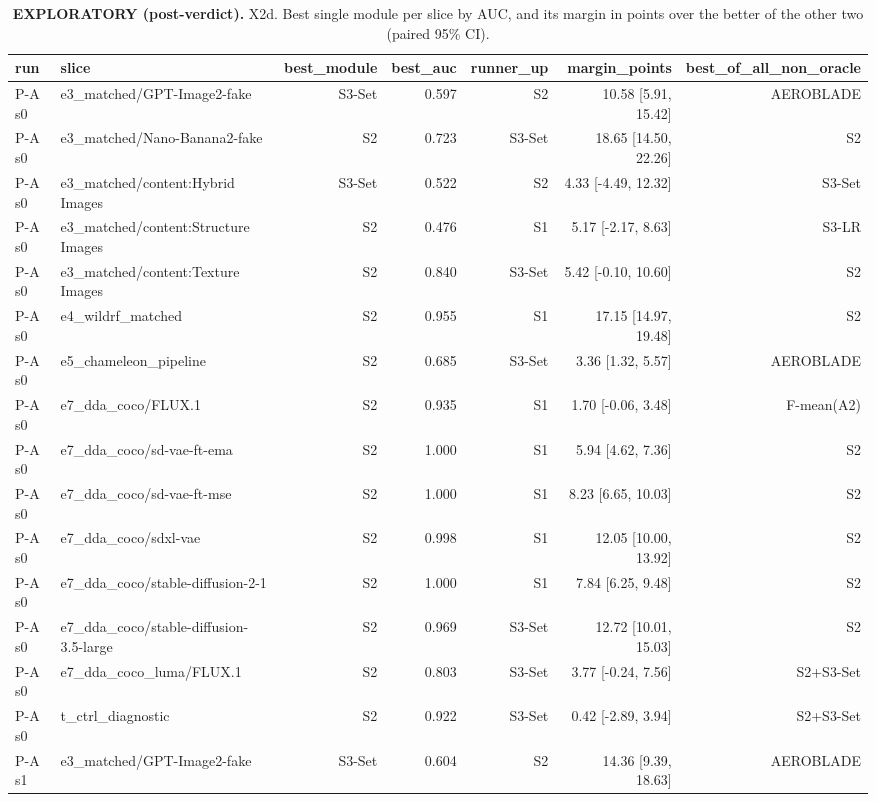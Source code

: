 \begin{table}[htbp]
\centering
\scriptsize
\caption{\textbf{EXPLORATORY (post-verdict).} X2d. Best single module per slice by AUC, and its margin in points over the better of the other two (paired 95\% CI).}
\label{tab:x2d-who-wins}
\begin{tabular}{llrrrrr}
\toprule
run & slice & best\_module & best\_auc & runner\_up & margin\_points & best\_of\_all\_non\_oracle \\
\midrule
P-A s0 & e3\_matched/GPT-Image2-fake & S3-Set & 0.597 & S2 & 10.58 [5.91, 15.42] & AEROBLADE \\
P-A s0 & e3\_matched/Nano-Banana2-fake & S2 & 0.723 & S3-Set & 18.65 [14.50, 22.26] & S2 \\
P-A s0 & e3\_matched/content:Hybrid Images & S3-Set & 0.522 & S2 & 4.33 [-4.49, 12.32] & S3-Set \\
P-A s0 & e3\_matched/content:Structure Images & S2 & 0.476 & S1 & 5.17 [-2.17, 8.63] & S3-LR \\
P-A s0 & e3\_matched/content:Texture Images & S2 & 0.840 & S3-Set & 5.42 [-0.10, 10.60] & S2 \\
P-A s0 & e4\_wildrf\_matched & S2 & 0.955 & S1 & 17.15 [14.97, 19.48] & S2 \\
P-A s0 & e5\_chameleon\_pipeline & S2 & 0.685 & S3-Set & 3.36 [1.32, 5.57] & AEROBLADE \\
P-A s0 & e7\_dda\_coco/FLUX.1 & S2 & 0.935 & S1 & 1.70 [-0.06, 3.48] & F-mean(A2) \\
P-A s0 & e7\_dda\_coco/sd-vae-ft-ema & S2 & 1.000 & S1 & 5.94 [4.62, 7.36] & S2 \\
P-A s0 & e7\_dda\_coco/sd-vae-ft-mse & S2 & 1.000 & S1 & 8.23 [6.65, 10.03] & S2 \\
P-A s0 & e7\_dda\_coco/sdxl-vae & S2 & 0.998 & S1 & 12.05 [10.00, 13.92] & S2 \\
P-A s0 & e7\_dda\_coco/stable-diffusion-2-1 & S2 & 1.000 & S1 & 7.84 [6.25, 9.48] & S2 \\
P-A s0 & e7\_dda\_coco/stable-diffusion-3.5-large & S2 & 0.969 & S3-Set & 12.72 [10.01, 15.03] & S2 \\
P-A s0 & e7\_dda\_coco\_luma/FLUX.1 & S2 & 0.803 & S3-Set & 3.77 [-0.24, 7.56] & S2+S3-Set \\
P-A s0 & t\_ctrl\_diagnostic & S2 & 0.922 & S3-Set & 0.42 [-2.89, 3.94] & S2+S3-Set \\
P-A s1 & e3\_matched/GPT-Image2-fake & S3-Set & 0.604 & S2 & 14.36 [9.39, 18.63] & AEROBLADE \\

\end{tabular}
\end{table}
